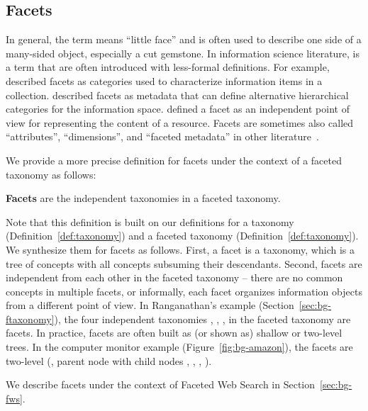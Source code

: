 \subsection{Facets}
\label{sec:bg-facet}
In general, the term  means ``little face'' and is often used to describe one side of a many-sided object, especially a cut gemstone. In information science literature,  is a  term that are often introduced with less-formal definitions. For example, \citet{hearst2006design} described facets as categories used to characterize information items in a collection. \citet{koren2008personalized} described facets as metadata that can define alternative hierarchical categories for the information space. \citet{bonino2009faset} defined a facet as an independent point of view for representing the content of a resource. Facets are sometimes also called ``attributes'', ``dimensions'', and ``faceted metadata'' in other literature~\cite{teevan2008challenges,li2010facetedpedia,yee2003faceted}.

We provide a more precise definition for facets under the context of a faceted taxonomy as follows:
\begin{definition}
\label{def:facet}
 \textbf{Facets} are the independent taxonomies in a faceted taxonomy.
\end{definition}
\noindent Note that this definition is built on our definitions for a taxonomy (Definition~\ref{def:taxonomy}) and a faceted taxonomy (Definition~\ref{def:taxonomy}). We synthesize them for facets as follows. First, a facet is a taxonomy, which is a tree of concepts with all concepts subsuming their descendants. Second, facets are independent from each other in the faceted taxonomy -- there are no common concepts in multiple facets, or informally, each facet organizes information objects from a different point of view. In Ranganathan's example (Section~\ref{sec:bg-ftaxonomy}), the four independent taxonomies , , ,  in the faceted taxonomy are facets. 
In practice, facets are often built as (or shown as) shallow or two-level trees. In the computer monitor example (Figure~\ref{fig:bg-amazon}), the facets are two-level (\eg, parent node  with child nodes , , , ).

We describe facets under the context of Faceted Web Search in Section~\ref{sec:bg-fws}.

